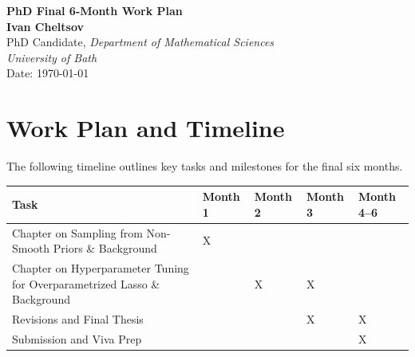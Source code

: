\documentclass[12pt,a4paper]{article}
\begin{document}
\begin{center}
    \Large \textbf{PhD Final 6-Month Work Plan} \\
    \normalsize
    \vspace{0.3cm}
    \textbf{Ivan Cheltsov} \\
    PhD Candidate, \textit{Department of Mathematical Sciences} \\
    \textit{University of Bath} \\
    Date: \today
\end{center}

\vspace{0.5cm}

\section{Work Plan and Timeline}
The following timeline outlines key tasks and milestones for the final six months.

\begin{center}
\begin{tabular}{|>{\raggedright\arraybackslash}p{3.5cm}|>{\centering\arraybackslash}p{1.5cm}|>{\centering\arraybackslash}p{1.5cm}|>{\centering\arraybackslash}p{1.5cm}|>{\centering\arraybackslash}p{1.5cm}|}
\hline
\textbf{Task} & \textbf{Month 1} & \textbf{Month 2} & \textbf{Month 3} & \textbf{Month 4--6} \\
\hline
Chapter on Sampling from Non-Smooth Priors \& Background& X & & & \\
\hline
Chapter on Hyperparameter Tuning for Overparametrized Lasso \& Background &  & X & X & \\
\hline
Revisions and Final Thesis & & & X & X \\
\hline
Submission and Viva Prep & & & & X \\
\hline
\end{tabular}
\end{center}
\end{document}
